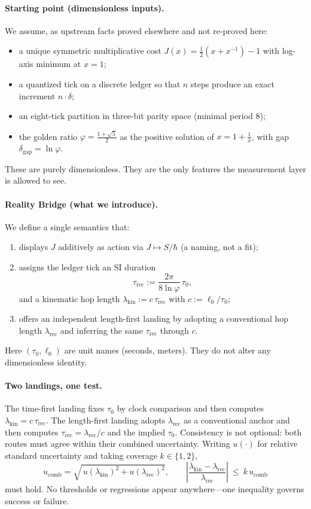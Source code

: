 \documentclass[11pt]{article}
\theoremstyle{plain}
\theoremstyle{definition}
\theoremstyle{remark}
\begin{document}
\paragraph{Starting point (dimensionless inputs).}
We assume, as upstream facts proved elsewhere and not re-proved here:
\begin{itemize}
  \item a unique symmetric multiplicative cost \(J(x)=\tfrac12(x+x^{-1})-1\) with log-axis minimum at \(x=1\);
  \item a quantized tick on a discrete ledger so that \(n\) steps produce an exact increment \(n\cdot\delta\);
  \item an eight-tick partition in three-bit parity space (minimal period \(8\));
  \item the golden ratio \(\varphi=\frac{1+\sqrt{5}}{2}\) as the positive solution of \(x=1+\frac1x\), with gap \(\delta_{\mathrm{gap}}=\ln\varphi\).
\end{itemize}
These are purely dimensionless. They are the only features the measurement layer is allowed to see.

\paragraph{Reality Bridge (what we introduce).}
We define a single semantics that:
\begin{enumerate}
  \item displays \(J\) additively as action via \(J\mapsto S/\hbar\) (a naming, not a fit);
  \item assigns the ledger tick an SI duration
  \[
  \tau_{\mathrm{rec}}:=\frac{2\pi}{8\ln\varphi}\,\tau_{0},
  \]
  and a kinematic hop length \(\lambda_{\mathrm{kin}}:=c\,\tau_{\mathrm{rec}}\) with \(c:=\ell_{0}/\tau_{0}\);
  \item offers an independent length-first landing by adopting a conventional hop length \(\lambda_{\mathrm{rec}}\) and inferring the same \(\tau_{\mathrm{rec}}\) through \(c\).
\end{enumerate}
Here \((\tau_{0},\ell_{0})\) are unit names (seconds, meters). They do not alter any dimensionless identity.

\paragraph{Two landings, one test.}
The time-first landing fixes \(\tau_{0}\) by clock comparison and then computes \(\lambda_{\mathrm{kin}}=c\,\tau_{\mathrm{rec}}\).
The length-first landing adopts \(\lambda_{\mathrm{rec}}\) as a conventional anchor and then computes \(\tau_{\mathrm{rec}}=\lambda_{\mathrm{rec}}/c\) and the implied \(\tau_{0}\).
Consistency is not optional: both routes must agree within their combined uncertainty. Writing \(u(\cdot)\) for relative standard uncertainty and taking coverage \(k\in\{1,2\}\),
\[
u_{\mathrm{comb}}=\sqrt{\,u(\lambda_{\mathrm{kin}})^{2}+u(\lambda_{\mathrm{rec}})^{2}},\qquad
\left|\frac{\lambda_{\mathrm{kin}}-\lambda_{\mathrm{rec}}}{\lambda_{\mathrm{rec}}}\right|\ \le\ k\,u_{\mathrm{comb}}
\]
must hold. No thresholds or regressions appear anywhere—one inequality governs success or failure.
\end{document}
